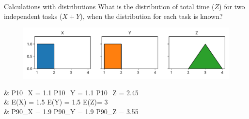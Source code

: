 \documentclass[12pt, aspectratio=149]{beamer}
\theoremstyle{plain}
\begin{document}
\begin{frame}[fragile]{Calculations with distributions}
	What is the distribution of total time ($Z$) for two independent tasks ($X + Y$), when the distribution for each task is known?
    \begin{center}
     \begin{figure}
     	\centering
     	\includegraphics[width=0.99\linewidth]{figures/add_uniform}
     \end{figure}
     \end{center}
	 \begin{flalign*}
     	&\hspace*{1em} P10_X = 1.1 \hspace*{4em} P10_Y = 1.1 \hspace*{4em}  P10_Z = 2.45 \\
	 	&\hspace*{1em} E(X) = 1.5  \hspace*{4.2em} E(Y) = 1.5  \hspace*{4.3em}  E(Z)= 3 \\
     	&\hspace*{1em} P90_X = 1.9 \hspace*{4em} P90_Y = 1.9 \hspace*{4em}  P90_Z = 3.55 \\
	\end{flalign*}
\end{frame}
\end{document}
